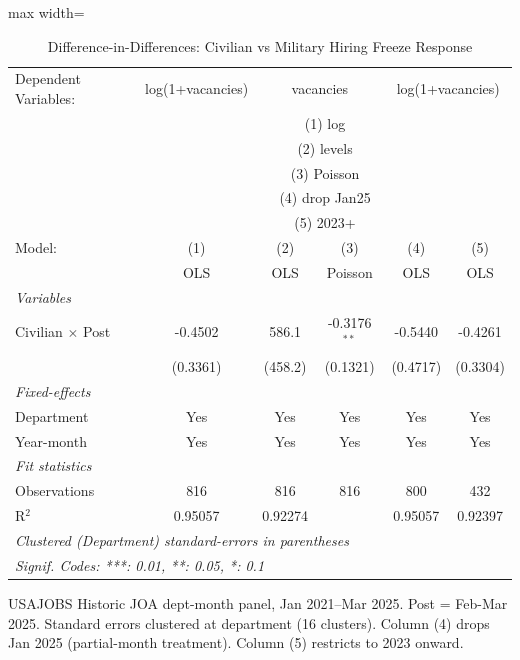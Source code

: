 
\begin{table}[htbp]
   \caption{\label{tab:main} Difference-in-Differences: Civilian vs Military Hiring Freeze Response}
   \centering
   \footnotesize
   \begin{adjustbox}{max width=\textwidth}
   \begin{tabular}{lccccc}
      \tabularnewline \midrule \midrule
      Dependent Variables: & log(1+vacancies) & \multicolumn{2}{c}{vacancies} & \multicolumn{2}{c}{log(1+vacancies)}\\
       & \multicolumn{5}{c}{(1) log} \\ 
       & \multicolumn{5}{c}{(2) levels} \\ 
       & \multicolumn{5}{c}{(3) Poisson} \\ 
       & \multicolumn{5}{c}{(4) drop Jan25} \\ 
       & \multicolumn{5}{c}{(5) 2023+} \\ 
      Model:                  & (1)      & (2)     & (3)            & (4)      & (5)\\  
                              &  OLS     & OLS     & Poisson        & OLS      & OLS\\  
      \midrule
      \emph{Variables}\\
      Civilian $\times$ Post  & -0.4502  & 586.1   & -0.3176$^{**}$ & -0.5440  & -0.4261\\   
                              & (0.3361) & (458.2) & (0.1321)       & (0.4717) & (0.3304)\\   
      \midrule
      \emph{Fixed-effects}\\
      Department              & Yes      & Yes     & Yes            & Yes      & Yes\\  
      Year-month              & Yes      & Yes     & Yes            & Yes      & Yes\\  
      \midrule
      \emph{Fit statistics}\\
      Observations            & 816      & 816     & 816            & 800      & 432\\  
      R$^2$                   & 0.95057  & 0.92274 &                & 0.95057  & 0.92397\\  
      \midrule \midrule
      \multicolumn{6}{l}{\emph{Clustered (Department) standard-errors in parentheses}}\\
      \multicolumn{6}{l}{\emph{Signif. Codes: ***: 0.01, **: 0.05, *: 0.1}}\\
   \end{tabular}
   \end{adjustbox}

   \par \raggedright
   USAJOBS Historic JOA dept-month panel, Jan 2021--Mar 2025. Post = Feb-Mar 2025. Standard errors clustered at department (16 clusters). Column (4) drops Jan 2025 (partial-month treatment). Column (5) restricts to 2023 onward.
\end{table}


